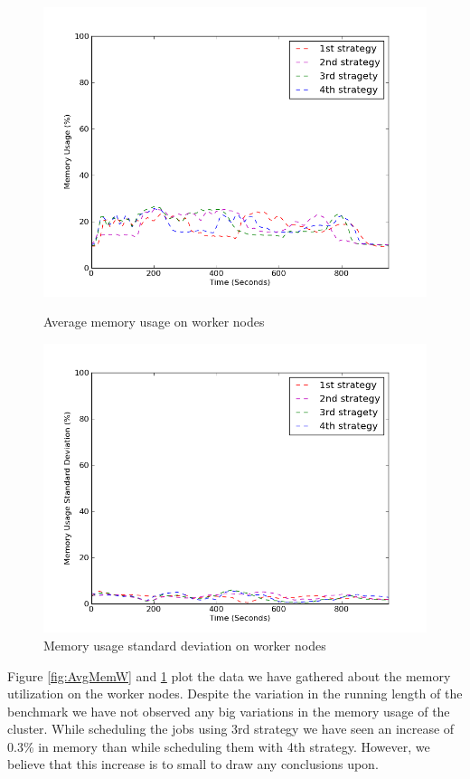 \documentclass[11pt,a4paper,twoside]{report}
\begin{document}
\begin{figure}[ht]
\begin{minipage}[b]{0.47\linewidth}
\centering
\includegraphics[scale=0.36]{avg-mem-w}
\caption{Average memory usage on worker nodes}
\label{fig:AvgMemW}
\end{minipage}
\hspace{0.2cm}
\begin{minipage}[b]{0.5\linewidth}
\centering
\includegraphics[scale=0.36]{sd-mem-w}
\caption{Memory usage standard deviation on worker nodes}
\label{fig:SdMemW}
\end{minipage}
\end{figure}


Figure \ref{fig:AvgMemW} and \ref{fig:SdMemW} plot the data we have gathered about the memory utilization on the worker nodes. Despite the variation in the running length of the benchmark we have not observed any big variations in the memory usage of the cluster. While scheduling the jobs using 3rd strategy we have seen an increase of 0.3\% in memory than while scheduling them with 4th strategy. However, we believe that this increase is to small to draw any conclusions upon.
\end{document}
